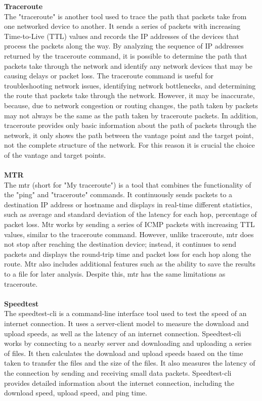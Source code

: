 \documentclass[eng]{class}
\begin{document}
\noindent
\textbf{Traceroute} \\
The "traceroute" is another tool used to trace the path that packets take from one networked device to another.
It sends a series of packets with increasing Time-to-Live (TTL) values and records the IP addresses of the devices that process the packets along the way.
By analyzing the sequence of IP addresses returned by the traceroute command,
it is possible to determine the path that packets take through the network and identify any network devices that may be causing delays or packet loss.
The traceroute command is useful for troubleshooting network issues, identifying network bottlenecks, and determining the route that packets take through the network.
However, it may be inaccurate, because, due to network congestion or routing changes,
the path taken by packets may not always be the same as the path taken by traceroute packets.
In addition, traceroute provides only basic information about the path of packets through the network,
it only shows the path between the vantage point and the target point, not the complete structure of the network.
For this reason it is crucial the choice of the vantage and target points.\\
\\
\textbf{MTR} \\
The mtr (short for "My traceroute") is a tool that combines the functionality of the "ping" and "traceroute" commands.
It continuously sends packets to a destination IP address or hostname and displays  in real-time
different statistics, such as average and standard deviation of the latency for each hop, percentage of packet loss.
Mtr works by sending a series of ICMP packets with increasing TTL values, similar to the traceroute command.
However, unlike traceroute, mtr does not stop after reaching the destination device; instead,
it continues to send packets and displays the round-trip time and packet loss for each hop along the route.
Mtr also includes additional features such as the ability to save the results to a file for later analysis.
Despite this, mtr has the same limitations as traceroute.\\
\\
\textbf{Speedtest} \\
The speedtest-cli is a command-line interface tool used to test the speed of an internet connection.
It uses a server-client model to measure the download and upload speeds, as well as the latency of an internet connection.
Speedtest-cli works by connecting to a nearby server and downloading and uploading a series of files.
It then calculates the download and upload speeds based on the time taken to transfer the files and the size of the files.
It also measures the latency of the connection by sending and receiving small data packets.
Speedtest-cli provides detailed information about the internet connection, including the download speed, upload speed, and ping time.
\end{document}
